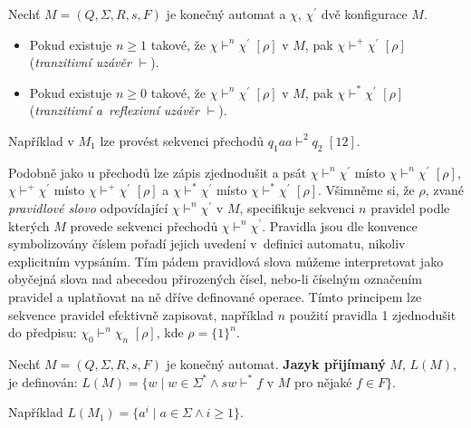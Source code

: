 \addtocounter{definition}{-1}
\begin{definition}
    Nechť $M=(Q, \Sigma ,R,s,F)$ je konečný automat a $\chi $, $\chi^{'}$ dvě konfigurace $M$.
    \begin{itemize}
        \item Pokud existuje $n \ge 1$ takové, že $\chi \vdash^n \chi^{'} $ $[\rho ]$ v $M$, pak $\chi \vdash^+ \chi^{'} $ $[\rho ]$ (\textit{tranzitivní uzávěr $\vdash $}).
        \item Pokud existuje $n \ge 0$ takové, že $\chi \vdash^n \chi^{'} $ $[\rho ]$ v $M$, pak $\chi \vdash^* \chi^{'} $ $[\rho ]$ (\textit{tranzitivní a~reflexivní uzávěr $\vdash $}).
    \end{itemize}
\end{definition}

\begin{example}
    Například v $M_1$ lze provést sekvenci přechodů $q_1aa \vdash^2 q_2 $ $[12]$.
\end{example}

Podobně jako u přechodů lze zápis zjednodušit a psát $\chi \vdash^n \chi^{'} $ místo $\chi \vdash^n \chi^{'} $ $[\rho ]$, $\chi \vdash^+ \chi^{'} $ místo $\chi \vdash^+ \chi^{'} $ $[\rho ]$ a $\chi \vdash^* \chi^{'} $ místo $\chi \vdash^* \chi^{'} $ $[\rho ]$. Všimněme si, že $ \rho $, zvané \textit{pravidlové slovo} odpovídající $\chi \vdash^n \chi^{'}$ v $M$, specifikuje sekvenci $n$ pravidel podle kterých $M$ provede sekvenci přechodů $\chi \vdash^n \chi^{'}$. Pravidla jsou dle konvence symbolizovány číslem pořadí jejich uvedení v~definici automatu, nikoliv explicitním vypsáním. Tím pádem pravidlová slova můžeme interpretovat jako obyčejná slova nad abecedou přirozených čísel, nebo-li číselným označením pravidel a uplatňovat na ně dříve definované operace. Tímto principem lze sekvence pravidel efektivně zapisovat, například $n$ použití pravidla 1 zjednodušit do předpisu: $\chi_0 \vdash^n \chi_n $ $[\rho ]$, kde $\rho = \{ 1 \}^n $.

\begin{definition}
    Nechť $M=(Q, \Sigma ,R,s,F)$ je konečný automat. \textbf{Jazyk přijímaný} $M$, $L(M)$, je definován: $L(M) = \{ w \mid w \in \Sigma^* \wedge sw \vdash^* f$ v $M$ pro nějaké $f \in F \} $.
\end{definition}

\begin{example}
    Například $L(M_1) = \{ a^i \mid a \in \Sigma \wedge i \ge 1 \} $.
\end{example}

